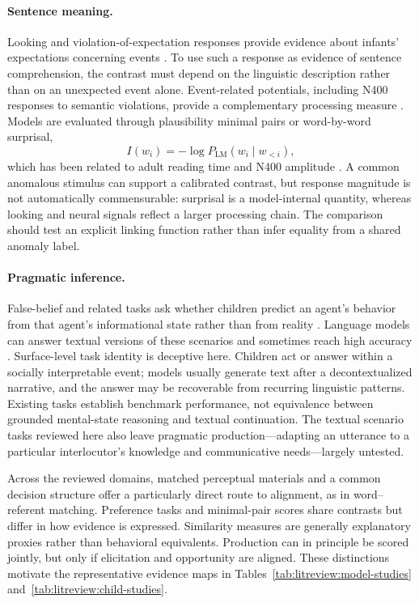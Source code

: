 \paragraph{Sentence meaning.}
Looking and violation-of-expectation responses provide evidence about infants' expectations concerning events \citep{aslin2007s,Margoni2023}. To use such a response as evidence of sentence comprehension, the contrast must depend on the linguistic description rather than on an unexpected event alone. Event-related potentials, including N400 responses to semantic violations, provide a complementary processing measure \citep{friedrich2006early,lozano2025development}. Models are evaluated through plausibility minimal pairs or word-by-word surprisal,
\[
  I(w_i) = -\log P_{\mathrm{LM}}(w_i \mid w_{<i}),
\]
which has been related to adult reading time and N400 amplitude \citep{hale2001probabilistic,SmithLevy2013,frank2015erp,michaelov2024strong}. A common anomalous stimulus can support a calibrated contrast, but response magnitude is not automatically commensurable: surprisal is a model-internal quantity, whereas looking and neural signals reflect a larger processing chain. The comparison should test an explicit linking function rather than infer equality from a shared anomaly label.

\paragraph{Pragmatic inference.}
False-belief and related tasks ask whether children predict an agent's behavior from that agent's informational state rather than from reality \citep{WimmerPerner1983,Wellman2001}. Language models can answer textual versions of these scenarios and sometimes reach high accuracy \citep{kosinski2024evaluating,Strachan2024}. Surface-level task identity is deceptive here. Children act or answer within a socially interpretable event; models usually generate text after a decontextualized narrative, and the answer may be recoverable from recurring linguistic patterns. Existing tasks establish benchmark performance, not equivalence between grounded mental-state reasoning and textual continuation. The textual scenario tasks reviewed here also leave pragmatic production---adapting an utterance to a particular interlocutor's knowledge and communicative needs---largely untested.

Across the reviewed domains, matched perceptual materials and a common decision structure offer a particularly direct route to alignment, as in word--referent matching. Preference tasks and minimal-pair scores share contrasts but differ in how evidence is expressed. Similarity measures are generally explanatory proxies rather than behavioral equivalents. Production can in principle be scored jointly, but only if elicitation and opportunity are aligned. These distinctions motivate the representative evidence maps in Tables~\ref{tab:litreview:model-studies} and~\ref{tab:litreview:child-studies}.

